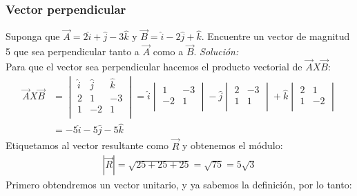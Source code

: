 \documentclass[12pt,openany]{book}
\begin{document}
			\subsubsection{Vector perpendicular}
				Suponga que $\vec{A}=2\hat{i}+\hat{j}-3\hat{k}$ y $\vec{B}=\hat{i}-2\hat{j}+\hat{k}$. Encuentre
				un vector de magnitud 5 que sea perpendicular tanto a $\vec{A}$ como a $\vec{B}$.
				\noindent\textsl{Soluci\'on:}\\
				Para que el vector sea perpendicular hacemos el producto vectorial de $\vec{A}X\vec{B}$:
				\begin{equation*}
				 	\begin{split}
				 		\vec{A}X\vec{B}&=\begin{vmatrix}
				 									\hat{i} & \hat{j} & \hat{k} \\
				 									   2    &    1    &    -3   \\
				 									   1    &   -2    &     1   \\    
				 								\end{vmatrix}
				 								=\hat{i} \begin{vmatrix}
				 	    										  1 & -3 \\
				 	    										 -2 & 1 \\
				 	    									\end{vmatrix}
				 	    							-\hat{j}\begin{vmatrix}
				 	    										2 & -3 \\
				 	    										1 &  1 \\
				 	    									\end{vmatrix}
				 	    						   +\hat{k}\begin{vmatrix}
				 	    										2 &  1 \\
				 	    										1 & -2 \\
				 	    									\end{vmatrix}\\
				 	    					   &=-5\hat{i}-5\hat{j}-5\hat{k}
				 	\end{split}
				\end{equation*}
				Etiquetamos al vector resultante como $\vec{R}$ y obtenemos el m\'odulo:\\
				\begin{equation*}
				 	\begin{split}
				 		|\vec{R}|=\sqrt{25+25+25}=\sqrt{75}=5\sqrt{3}
				 	\end{split}
				\end{equation*}
				Primero obtendremos un vector unitario, y ya sabemos la definici\'on, por lo tanto:
\end{document}
